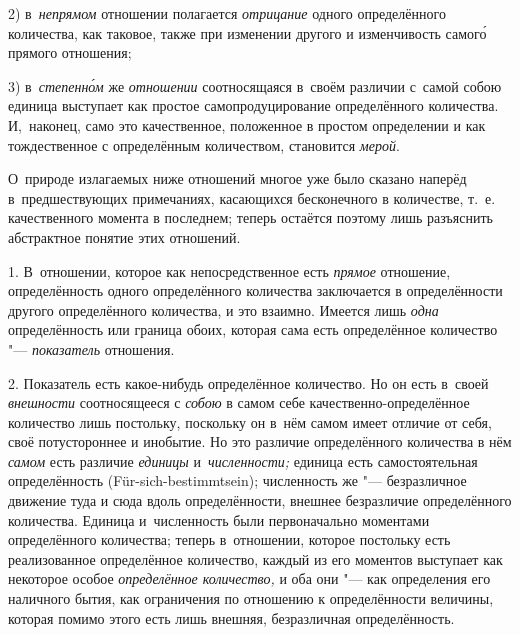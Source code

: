 2) в~{\em непрямом} отношении полагается {\em отрицание} одного определённого
количества, как таковое, также при изменении другого и изменчивость самог\'{о}
прямого отношения;

3) в~{\em степенн\'{о}м} же {\em отношении} соотносящаяся в~своём различии
с~самой собою единица выступает как простое самопродуцирование определённого
количества. И,~наконец, само это качественное, положенное в простом определении
и как тождественное с определённым количеством, становится {\em мерой}.

О~природе излагаемых ниже отношений многое уже было сказано наперёд
в~предшествующих примечаниях, касающихся бесконечного в количестве, т.~е.
качественного момента в последнем; теперь остаётся поэтому лишь разъяснить
абстрактное понятие этих отношений.


1. В~отношении, которое как непосредственное есть {\em прямое} отношение,
определённость одного определённого количества заключается в определённости
другого определённого количества, и это взаимно. Имеется лишь {\em одна}
определённость или граница обоих, которая сама есть определённое количество
"--- {\em показатель} отношения.

2. Показатель есть какое-нибудь определённое количество. Но он есть в~своей
{\em внешности} соотносящееся с {\em собою} в самом себе
качественно-определённое количество лишь постольку, поскольку он в~нём самом
имеет отличие от себя, своё потустороннее и инобытие. Но это различие
определённого количества в нём {\em самом} есть различие {\em единицы}
и~{\em численности;} единица есть самостоятельная определённость
(Für-sich-bestimmt\-sein); численность же "--- безразличное движение туда и
сюда вдоль определённости, внешнее безразличие определённого количества.
Единица и~численность были первоначально моментами определённого количества;
теперь в~отношении, которое постольку есть реализованное определённое
количество, каждый из его моментов выступает как некоторое особое
{\em определённое количество,} и оба они "--- как определения его наличного
бытия, как ограничения по отношению к определённости величины, которая помимо
этого есть лишь внешняя, безразличная определённость.

